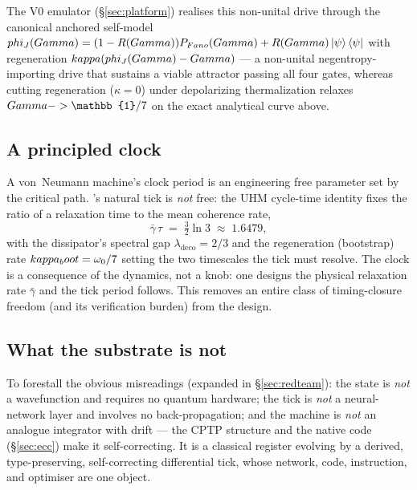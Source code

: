 The V0 emulator (\S\ref{sec:platform}) realises this non-unital drive through
the canonical anchored self-model $phi_J(Gamma)=(1-R(Gamma))P_{Fano}(Gamma)+R(Gamma)\ket{\psi}\bra{\psi}$
with regeneration $kappa(phi_J(Gamma)-Gamma)$ --- a non-unital
negentropy-importing drive that sustains a viable attractor passing all four
gates, whereas cutting regeneration ($\kappa=0$) under depolarizing
thermalization relaxes $\Gam\to\mathbb{1}/7$ on the exact analytical curve
above.

\subsection{A principled clock}

A von~Neumann machine's clock period is an engineering free parameter set by
the critical path. \TALOS{}'s natural tick is \emph{not} free: the UHM
cycle-time identity fixes the ratio of a relaxation time to the mean
coherence rate,
\begin{equation}
\bar\gamma\,\tau \;=\; \tfrac{3}{2}\ln 3 \;\approx\; 1.6479,
\end{equation}
with the dissipator's spectral gap $\lambda_{\mathrm{deco}}=2/3$ and the
regeneration (bootstrap) rate $kappa_boot=\omega_0/7$ setting the two timescales
the tick must resolve. The clock is a consequence of the dynamics, not a knob:
one designs the physical relaxation rate $\bar\gamma$ and the tick period
follows. This removes an entire class of timing-closure freedom (and its
verification burden) from the design.

\subsection{What the substrate is not}

To forestall the obvious misreadings (expanded in \S\ref{sec:redteam}): the
state is \emph{not} a wavefunction and requires no quantum hardware; the tick
is \emph{not} a neural-network layer and involves no back-propagation; and
the machine is \emph{not} an analogue integrator with drift --- the CPTP
structure and the native code (\S\ref{sec:ecc}) make it self-correcting. It
is a classical register evolving by a derived, type-preserving,
self-correcting differential tick, whose network, code, instruction, and
optimiser are one object.
